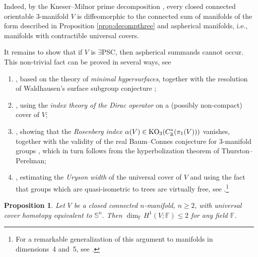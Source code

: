 \documentclass[10pt,a4paper]{amsart}
\numberwithin{equation}{section}
\newtheorem{Proposition}[Theorem]{Proposition}
\newcommand{\F}{\mathbb{F}}
\newcommand{\R}{\mathbb{R}}
\newcommand{\SSS}{\mathbb{S}}
\newcommand{\myicon}{$\,\,\,\triangleright$}
\newcommand{\yes}{{\color {blue!70!black}$\exists$}{\sf PSC}}
\begin{document}
Indeed, by the Kneser--Milnor prime decomposition \cite{Milnor1962}, every closed connected orientable $3$-manifold $V$ is diffeomorphic to the connected sum of manifolds of the form described in Proposition \ref{prop:decompthree} and aspherical manifolds, i.e., manifolds with contractible universal covers.

It remains to show that if $V$ is \yes, then aspherical summands cannot occur.
This non-trivial fact can be proved in several ways, see
\begin{enumerate}[\myicon]\itemsep=0pt
 \item \cite[Theorem 5.2]{S-Y1979}, based on the theory of {\em minimal hypersurfaces}, together with the resolution of Waldhausen's surface subgroup conjecture \cite{K-M2012};
\item \cite[Theorem 8.1]{G-L1983}, using the {\em index theory of the Dirac operator} on a (possibly non-compact) cover of $V$;
\item \cite[Theorem 3.4]{Ros1986}, showing that the {\em Rosenberg index} $\alpha(V) \in {\rm KO}_3(C^*_{\R} (\pi_1(V)))$ vanishes, together with the validity of the real Baum--Connes conjecture for $3$-manifold groups \cite{MOP08}, which in turn follows from the hyperbolization theorem of Thurston--Perelman;
\item \cite[Corollary 3.10.1\,(F$''$)]{Gr21}, estimating the {\em Uryson width} of the universal cover of $V$ and using the fact that groups which are quasi-isometric to trees are virtually free, see \cite[Theorem~7.19]{GdlH}.\footnote{For a remarkable generalization of this argument to manifolds in dimensions~4 and~5, see \cite{Ch-Li}.}
\end{enumerate}

\begin{Proposition} \label{ranks}
Let $V$ be a closed connected $n$-manifold, $n \geq 2$, with universal cover homotopy equivalent to $\SSS^n$.
Then $\dim_{\F} H^1 (V; \F) \leq 2$ for any field $\F$.
\end{Proposition}
\end{document}
